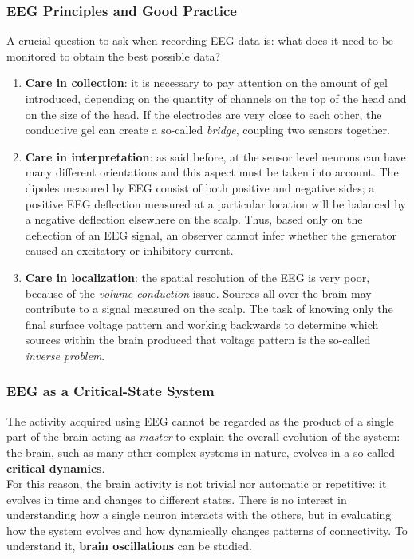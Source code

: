 \subsubsection{EEG Principles and Good Practice}
A crucial question to ask when recording EEG data is: what does it need to be monitored to
obtain the best possible data?
\begin{enumerate}
    \item \textbf{Care in collection}: it is necessary to pay attention on the amount of gel
          introduced, depending on the quantity of channels on the top of the head and on the
          size of the head. If the electrodes are very close to each other, the conductive gel
          can create a so-called \textit{bridge}, coupling two sensors together.
    \item \textbf{Care in interpretation}: as said before, at the sensor level neurons can have
          many different orientations and this aspect must be taken into account. The dipoles
          measured by EEG consist of both positive and negative sides; a positive EEG
          deflection measured at a particular location will be balanced by a negative
          deflection elsewhere on the scalp. Thus, based only on the deflection of an EEG
          signal, an observer cannot infer whether the generator caused an excitatory or
          inhibitory current.
    \item \textbf{Care in localization}: the spatial resolution of the EEG is very poor,
          because of the \textit{volume conduction} issue. Sources all over the brain may
          contribute to a signal measured on the scalp. The task of knowing only the final
          surface voltage pattern and working backwards to determine which sources within
          the brain produced that voltage pattern is the so-called \textit{inverse problem}.
\end{enumerate}
\subsubsection{EEG as a Critical-State System}
The activity acquired using EEG cannot be regarded as the product of a single part of the brain
acting as \textit{master} to explain the overall evolution of the system: the brain, such
as many other complex systems in nature, evolves in a so-called \textbf{critical dynamics}.\\
For this reason, the brain activity is not trivial nor automatic or repetitive: it evolves in
time and changes to different states. There is no interest in understanding how a single
neuron interacts with the others, but in evaluating how the system evolves and how
dynamically changes patterns of connectivity. To understand it, \textbf{brain oscillations}
can be studied.


